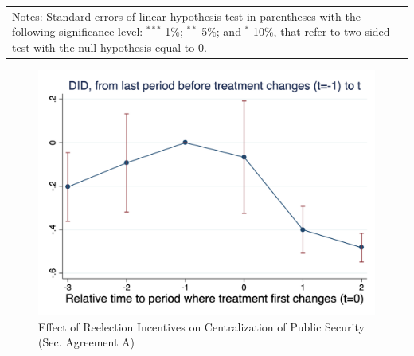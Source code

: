 \documentclass[12pt]{amsart}
\numberwithin{equation}{section}
\theoremstyle{definition}
\theoremstyle{definition}
\theoremstyle{definition}
\begin{document}
\begin{appendix}
\begin{table}[htbp]
{\begin{tabular}{lcccccccc}
 
          
\hline \hline
\multicolumn{9}{p{1.4\textwidth}}{\footnotesize{Notes: Standard errors of linear hypothesis test in parentheses with the following significance-level: $^{***}$ 1\%; $^{**}$ 5\%; and $^*$ 10\%, that refer to two-sided test with the null hypothesis equal to 0.}} \\
\end{tabular}
}
\end{table}

\begin{table}[htbp]\def\sym#1{\ifmmode^{#1}\else\(^{#1}\)\fi}
\centering
\caption{Effect of Reelection Incentives on Security Provision Centralization, Wild Bootstrap}
\label{tab:naive_coop_agreements}
\end{table}




\begin{figure}[h]  
\centering
\caption{Effect of Reelection Incentives on Centralization of Public Security (Sec. Agreement A)} 
\label{fig:chaisemartin_acuerdo}

      
\includegraphics[width=1\textwidth]{Figures/chaisemartin_acuerdo.png}
       

\end{figure}
\end{appendix}
\end{document}
